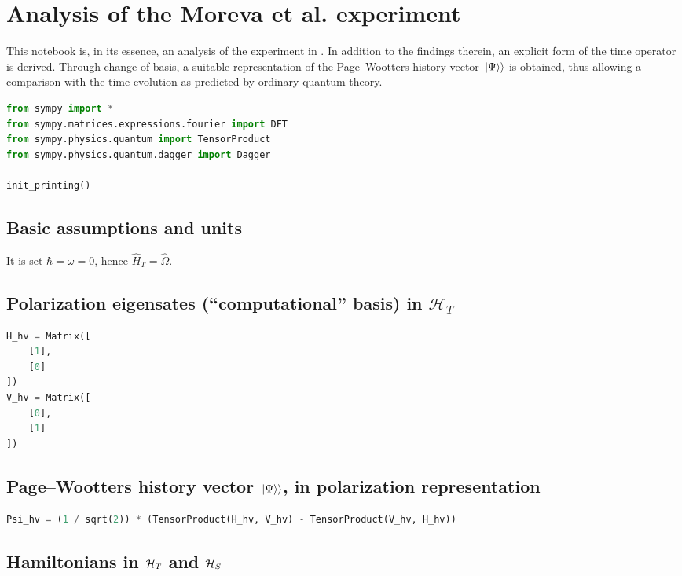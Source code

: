 \section{Analysis of the Moreva et al. experiment}

This notebook is, in its essence, an analysis of the experiment in \cite{Moreva:illustration, Moreva:synthetic}.
In addition to the findings therein, an explicit form of the time operator is derived.
Through change of basis, a suitable 
representation of the Page--Wootters history vector $\left.\left| \Psi \right\rangle\right\rangle$
is obtained,
thus allowing a comparison with the time evolution
as predicted by ordinary quantum theory.

\begin{lstlisting}[language=Python]
from sympy import *
from sympy.matrices.expressions.fourier import DFT
from sympy.physics.quantum import TensorProduct
from sympy.physics.quantum.dagger import Dagger

init_printing()
\end{lstlisting}

\subsection*{Basic assumptions and units}

It is set $\hbar = \omega = 0$, hence $\hat{H}_T = \hat{\Omega}$.

\subsection*{Polarization eigensates (``computational'' basis) in $\mathcal{H}_T$}

\begin{lstlisting}[language=Python]
H_hv = Matrix([
    [1],
    [0]
])
V_hv = Matrix([
    [0],
    [1]
])
\end{lstlisting}

\subsection*{Page--Wootters history vector $\left.\left| \Psi \right\rangle\right\rangle$, in polarization representation}

\begin{lstlisting}[language=Python]
Psi_hv = (1 / sqrt(2)) * (TensorProduct(H_hv, V_hv) - TensorProduct(V_hv, H_hv))
\end{lstlisting}

\subsection*{Hamiltonians in $\mathcal{H}_T$ and $\mathcal{H}_S$}

